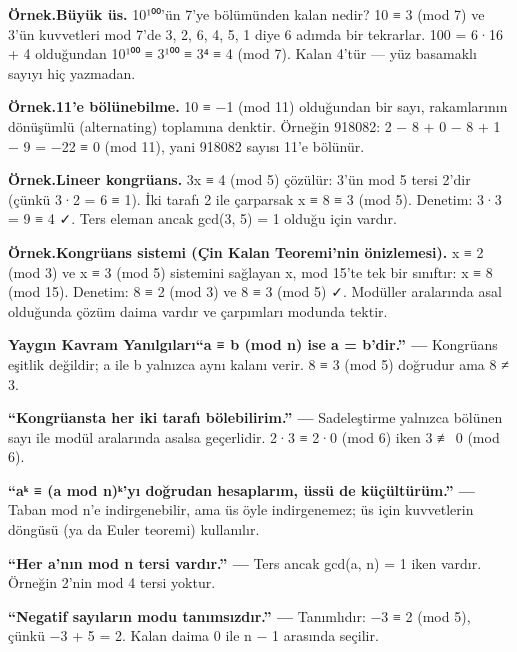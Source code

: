 \begin{tcolorbox}[bookbox,colback=cEx]\textbf{\textsf{\textcolor{cAcc}{Örnek.}}}\quad \textbf{Büyük üs. }10¹⁰⁰’ün 7’ye bölümünden kalan nedir? 10 ≡ 3 (mod 7) ve 3’ün kuvvetleri mod 7’de 3, 2, 6, 4, 5, 1 diye 6 adımda bir tekrarlar. 100 = 6·16 + 4 olduğundan 10¹⁰⁰ ≡ 3¹⁰⁰ ≡ 3⁴ ≡ 4 (mod 7). Kalan 4’tür — yüz basamaklı sayıyı hiç yazmadan.\end{tcolorbox}

\begin{tcolorbox}[bookbox,colback=cEx]\textbf{\textsf{\textcolor{cAcc}{Örnek.}}}\quad \textbf{11’e bölünebilme. }10 ≡ −1 (mod 11) olduğundan bir sayı, rakamlarının dönüşümlü (alternating) toplamına denktir. Örneğin 918082: 2 − 8 + 0 − 8 + 1 − 9 = −22 ≡ 0 (mod 11), yani 918082 sayısı 11’e bölünür.\end{tcolorbox}

\begin{tcolorbox}[bookbox,colback=cEx]\textbf{\textsf{\textcolor{cAcc}{Örnek.}}}\quad \textbf{Lineer kongrüans. }3x ≡ 4 (mod 5) çözülür: 3’ün mod 5 tersi 2’dir (çünkü 3·2 = 6 ≡ 1). İki tarafı 2 ile çarparsak x ≡ 8 ≡ 3 (mod 5). Denetim: 3·3 = 9 ≡ 4 ✓. Ters eleman ancak gcd(3, 5) = 1 olduğu için vardır.\end{tcolorbox}

\begin{tcolorbox}[bookbox,colback=cEx]\textbf{\textsf{\textcolor{cAcc}{Örnek.}}}\quad \textbf{Kongrüans sistemi (Çin Kalan Teoremi’nin önizlemesi). }x ≡ 2 (mod 3) ve x ≡ 3 (mod 5) sistemini sağlayan x, mod 15’te tek bir sınıftır: x ≡ 8 (mod 15). Denetim: 8 ≡ 2 (mod 3) ve 8 ≡ 3 (mod 5) ✓. Modüller aralarında asal olduğunda çözüm daima vardır ve çarpımları modunda tektir.\end{tcolorbox}

\begin{tcolorbox}[bookbox,colback=cMis]\textbf{\textsf{\textcolor{cAcc}{Yaygın Kavram Yanılgıları}}}\quad \textbf{“a ≡ b (mod n) ise a = b’dir.” — }Kongrüans eşitlik değildir; a ile b yalnızca aynı kalanı verir. 8 ≡ 3 (mod 5) doğrudur ama 8 ≠ 3.\par\medskip{}\textbf{“Kongrüansta her iki tarafı bölebilirim.” — }Sadeleştirme yalnızca bölünen sayı ile modül aralarında asalsa geçerlidir. 2·3 ≡ 2·0 (mod 6) iken 3 ≢ 0 (mod 6).\par\medskip{}\textbf{“aᵏ ≡ (a mod n)ᵏ’yı doğrudan hesaplarım, üssü de küçültürüm.” — }Taban mod n’e indirgenebilir, ama üs öyle indirgenemez; üs için kuvvetlerin döngüsü (ya da Euler teoremi) kullanılır.\par\medskip{}\textbf{“Her a’nın mod n tersi vardır.” — }Ters ancak gcd(a, n) = 1 iken vardır. Örneğin 2’nin mod 4 tersi yoktur.\par\medskip{}\textbf{“Negatif sayıların modu tanımsızdır.” — }Tanımlıdır: −3 ≡ 2 (mod 5), çünkü −3 + 5 = 2. Kalan daima 0 ile n − 1 arasında seçilir.\end{tcolorbox}

